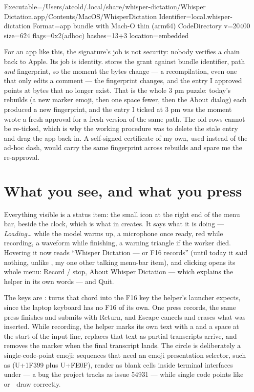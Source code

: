 \documentclass[11pt,a4paper]{article}
\newcommand{\chord}{\keys{{\glyphSF\symbol{"2303}},{\glyphSF\symbol{"2325}},D}}  %
\begin{document}
\begin{cmdout}
Executable=/Users/atcold/.local/share/whisper-dictation/Whisper Dictation.app/Contents/MacOS/WhisperDictation
Identifier=local.whisper-dictation
Format=app bundle with Mach-O thin (arm64)
CodeDirectory v=20400 size=624 flags=0x2(adhoc) hashes=13+3 location=embedded
\end{cmdout}

For an app like this, the signature's job is not security: nobody verifies a chain back to Apple. Its job is identity.  stores the grant against bundle identifier, path \emph{and} fingerprint, so the moment the bytes change --- a recompilation, even one that only edits a comment --- the fingerprint changes, and the entry I approved points at bytes that no longer exist. That is the whole 3 pm puzzle: today's rebuilds (a new marker emoji, then one space fewer, then the About dialog) each produced a new fingerprint, and the entry I ticked at 3 pm was the moment  wrote a fresh approval for a fresh version of the same path. The old rows cannot be re-ticked, which is why the working procedure was to delete the stale entry and drag the app back in. A self-signed certificate of my own, used instead of the ad-hoc dash, would carry the same fingerprint across rebuilds and spare me the re-approval.

\section{What you see, and what you press}

Everything visible is a status item: the small icon at the right end of the menu bar, beside the clock, which is what  in  creates. It says what it is doing --- \emph{Loading…} while the model warms up, a microphone once ready, red while recording, a waveform while finishing, a warning triangle if the worker died. Hovering it now reads ``Whisper Dictation --- \chord or F16 records'' (until today it said nothing, unlike , my one other talking menu-bar item), and clicking opens its whole menu: Record / stop, About Whisper Dictation --- which explains the helper in its own words --- and Quit.

The keys are \chord:  turns that chord into the F16 key the helper's launcher expects, since the laptop keyboard has no F16 of its own. One press records, the same press finishes and submits with Return, and Escape cancels and erases what was inserted. While recording, the helper marks its own text with a  and a space at the start of the input line, replaces that text as partial transcripts arrive, and removes the marker when the final transcript lands. The circle is deliberately a single-code-point emoji: sequences that need an emoji presentation selector, such as  (U+1F399 plus U+FE0F), render as blank cells inside terminal interfaces under  --- a bug the  project tracks as issue 54931 --- while single code points like 🔴 or 🎤 draw correctly.
\end{document}
